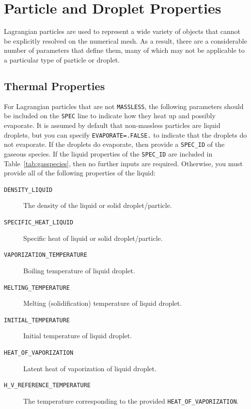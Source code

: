 \documentclass[11pt]{book}
\newcommand{\ct}{\tt\small}
\begin{document}
\clearpage

\section{Particle and Droplet Properties}

Lagrangian particles are used to represent a wide variety of objects that cannot be explicitly resolved on the numerical
mesh. As a result, there are a considerable number of parameters that define them, many of which may not be applicable to
a particular type of particle or droplet.


\subsection{Thermal Properties}

\label{thermal_part_props}

For Lagrangian particles that are not {\ct MASSLESS}, the following parameters should be
included on the {\ct SPEC} line to indicate how they heat up and possibly evaporate. It is assumed by default that non-massless particles are
liquid droplets, but you can specify {\ct EVAPORATE=.FALSE.} to indicate that the droplets do not evaporate. If the droplets do evaporate, then
provide a {\ct SPEC\_ID} of the gaseous species. If the liquid properties of the {\ct SPEC\_ID} are included in Table~\ref{tab:gasspecies},
then no further inputs are required. Otherwise, you must provide all of the following properties of the liquid:
\begin{description}
\item[{\ct DENSITY\_LIQUID}] The density of the liquid or solid droplet/particle.
\item[{\ct SPECIFIC\_HEAT\_LIQUID}] Specific heat of liquid or solid droplet/particle.
\item[{\ct VAPORIZATION\_TEMPERATURE}] Boiling temperature of liquid droplet.
\item[{\ct MELTING\_TEMPERATURE}] Melting (solidification) temperature of liquid droplet.
\item[{\ct INITIAL\_TEMPERATURE}] Initial temperature of liquid droplet.
\item[{\ct HEAT\_OF\_VAPORIZATION}] Latent heat of vaporization of liquid droplet.
\item[{\ct H\_V\_REFERENCE\_TEMPERATURE}] The temperature corresponding to the provided {\ct HEAT\_OF\_VAPORIZATION}.
\end{description}
\end{document}
